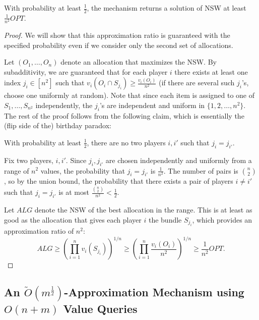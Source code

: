 \documentclass{article}
\begin{document}
\begin{lemma}
With probability at least $\frac12$, the mechanism returns a solution of NSW at least $\frac{1}{n^2} OPT$.
\end{lemma}
\begin{proof}
We will show that this approximation ratio is guaranteed with the specified probability even if we consider only the second set of allocations.

Let $(O_1,\ldots, O_n)$ denote an allocation that maximizes the NSW. By subadditivity, we are guaranteed that for each player $i$ there exists at least one index $j_i \in [n^2]$ such that $v_i(O_i \cap S_{j_i})\geq \frac {v_i(O_i)} {n^2}$ (if there are several such $j_i$'s, choose one uniformly at random). Note that since each item is assigned to one of $S_1,\ldots, S_{n^2}$ independently, the $j_i$'s are independent and uniform in $\{1,2,\ldots, n^2\}$. The rest of the proof follows from the following claim, which is essentially the (flip side of the) birthday paradox:
\begin{claim*}
With probability at least $\frac 1 {2}$, there are no two players $i,i'$ such that $j_i=j_{i'}$.
\end{claim*}
\begin{subproof}
Fix two players, $i,i'$. Since $j_i, j_{i'}$ are chosen independently and uniformly from a range of $n^2$ values, the probability that $j_i=j_{i'}$ is $\frac 1 {n^2}$. The number of pairs is $\binom{n}{2}$, so by the union bound, the probability that there exists a pair of players $i \neq i'$ such that $j_i=j_{i'}$ is at most $\frac {\binom{n}{2}} {n^2} < \frac 1 2$.
\end{subproof}

Let $ALG$ denote the NSW of the best allocation in the range. This is at least as good as the allocation that gives each player $i$ the bundle $S_{j_i}$, which provides an approximation ratio of $n^2$:
$$
ALG \geq \left( \prod_{i=1}^{n}  v_i(S_{j_i}) \right)^{1/n} \geq \left( \prod_{i=1}^{n}  \frac {v_i(O_i)}{n^2}  \right)^{1/n}  \geq \frac{1}{n^2} OPT.
$$
\end{proof}



\subsection{An \texorpdfstring{$\tilde O(m^{\frac12})$}{\~O(m\^{}(1/2))}-Approximation Mechanism using \texorpdfstring{$O(n+m)$}{O(n+m)} Value Queries}\label{subsec-approx-m12}
\end{document}
